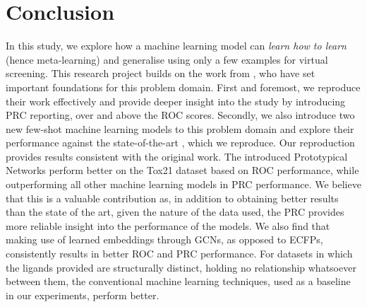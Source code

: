 \section{Conclusion}

In this study, we explore how a machine learning model can \textit{learn how to learn} (hence meta-learning) and generalise using only a few examples for virtual screening. This research project builds on the work from \citet{altae2017low}, who have set important foundations for this problem domain. First and foremost, we reproduce their work effectively and provide deeper insight into the study by introducing PRC reporting, over and above the ROC scores. Secondly, we also introduce two new few-shot machine learning models to this problem domain and explore their performance against the state-of-the-art \cite{altae2017low}, which we reproduce. Our reproduction provides results consistent with the original work. The introduced Prototypical Networks perform better on the Tox21 dataset based on ROC performance, while outperforming all other machine learning models in PRC performance. We believe that this is a valuable contribution as, in addition to obtaining better results than the state of the art, given the nature of the data used, the PRC provides more reliable insight into the performance of the models. We also find that making use of learned embeddings through GCNs, as opposed to ECFPs, consistently results in better ROC and PRC performance. For datasets in which the ligands provided are structurally distinct, holding no relationship whatsoever between them, the conventional machine learning techniques, used as a baseline in our experiments, perform better.